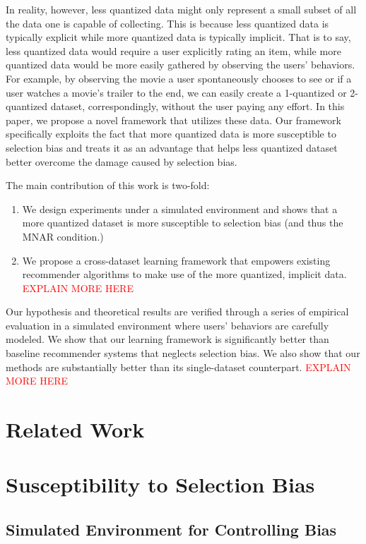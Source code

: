 \documentclass{article}
\begin{document}
In reality, however, less quantized data might only represent a small subset of all the data one is capable of collecting. This is because less quantized data is typically explicit while more quantized data is typically implicit. That is to say, less quantized data would require a user explicitly rating an item, while more quantized data would be more easily gathered by observing the users' behaviors. For example, by observing the movie a user spontaneously chooses to see or if a user watches a movie's trailer to the end, we can easily create a 1-quantized or 2-quantized dataset, correspondingly, without the user paying any effort. In this paper, we propose a novel framework that utilizes these data. Our framework specifically exploits the fact that more quantized data is more susceptible to selection bias and treats it as an advantage that helps less quantized dataset better overcome the damage caused by selection bias.

The main contribution of this work is two-fold:
\begin{enumerate}
  \item We design experiments under a simulated environment and shows that a more quantized dataset is more susceptible to selection bias (and thus the MNAR condition.)
  \item We propose a cross-dataset learning framework that empowers existing recommender algorithms to make use of the more quantized, implicit data. \textcolor{red}{EXPLAIN MORE HERE}
\end{enumerate}

Our hypothesis and theoretical results are verified through a series of empirical evaluation in a simulated environment where users' behaviors are carefully modeled. We show that our learning framework is significantly better than baseline recommender systems that neglects selection bias. We also show that our methods are substantially better than its single-dataset counterpart. \textcolor{red}{EXPLAIN MORE HERE}

\section{Related Work}

\section{Susceptibility to Selection Bias}

\subsection{Simulated Environment for Controlling Bias}
\end{document}
